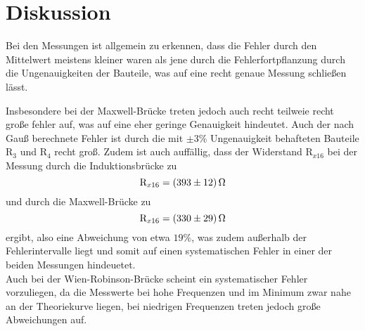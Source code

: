 \section{Diskussion}
Bei den Messungen ist allgemein zu erkennen, dass die Fehler durch den Mittelwert
meistens kleiner waren als jene durch die Fehlerfortpflanzung durch die Ungenauigkeiten
der Bauteile, was auf eine recht genaue Messung schließen lässt.

\noindent Insbesondere bei der Maxwell-Brücke treten jedoch auch recht teilweie
recht große fehler auf, was auf eine eher geringe Genauigkeit hindeutet. Auch der nach Gauß
berechnete Fehler ist durch die mit $\pm 3 \% $ Ungenauigkeit behafteten Bauteile
$\text{R}_3 $ und $\text{R}_4 $ recht groß.
Zudem ist auch auffällig, dass der Widerstand $ \text{R}_{x16} $ bei der Messung
durch die Induktionsbrücke zu
\begin{equation*}
  \text{R}_{x16} = \SI{393 (12)}{\ohm}
\end{equation*}
und durch die Maxwell-Brücke zu
\begin{equation*}
  \text{R}_{x16} = \SI{330 (29)}{\ohm}
\end{equation*}
ergibt, also eine Abweichung von etwa $ 19 \% $, was zudem außerhalb der
Fehlerintervalle liegt und somit auf einen systematischen Fehler in einer der beiden
Messungen hindeuetet.\\
\noindent Auch bei der Wien-Robinson-Brücke scheint ein systematischer Fehler vorzuliegen,
da die Messwerte bei hohe Frequenzen und im Minimum zwar nahe an der Theoriekurve
liegen, bei niedrigen Frequenzen treten jedoch große Abweichungen auf. 
